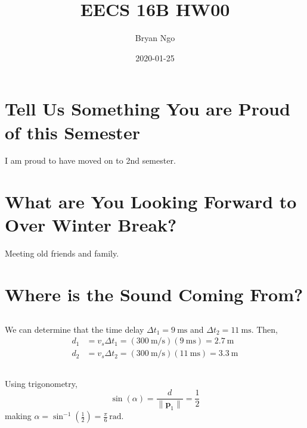 \documentclass[]{article}
\title{EECS 16B HW00}
\author{Bryan Ngo}
\date{2020-01-25}
\begin{document}
\maketitle

\section{Tell Us Something You are Proud of this Semester}

I am proud to have moved on to 2nd semester.

\section{What are You Looking Forward to Over Winter Break?}

Meeting old friends and family.

\section{Where is the Sound Coming From?}

\subsection{}

We can determine that the time delay \(\Delta t_1 = \SI{9}{\milli\second}\) and \(\Delta t_2 = \SI{11}{\milli\second}\).
Then,
\begin{align}
	d_1 &= v_s \Delta t_1 = (\SI{300}{\meter\per\second})(\SI{9}{\milli\second}) = \SI{2.7}{\meter} \\
	d_2 &= v_s \Delta t_2 = (\SI{300}{\meter\per\second})(\SI{11}{\milli\second}) = \SI{3.3}{\meter}
\end{align}

\subsection{}

Using trigonometry,
\begin{equation}
	\sin(\alpha) = \frac{d}{\|\bm{p}_1\|} = \frac{1}{2}
\end{equation}
making \(\alpha = \sin^{-1}\left(\frac{1}{2}\right) = \frac{\pi}{6} \,  \si{\radian}\).

\subsection{}
\end{document}

